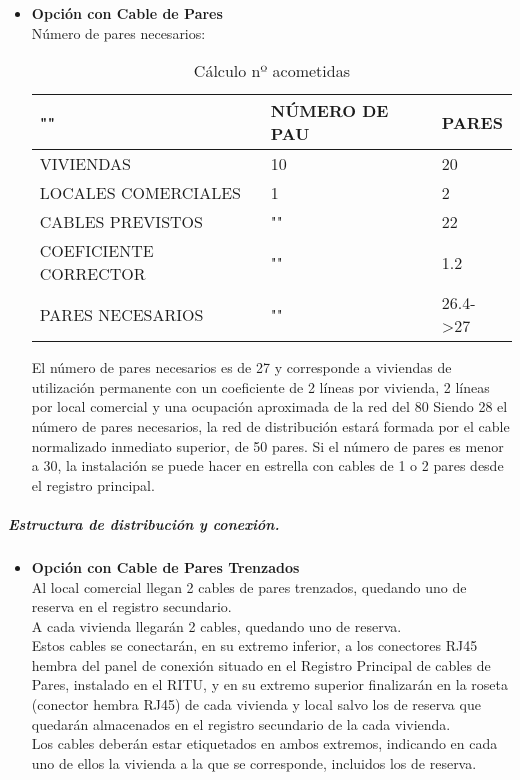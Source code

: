 \begin{itemize}
	\item \textbf{Opción con Cable de Pares}\\
	Número de pares necesarios:\\
	\begin{table}[H]
\centering
\begin{tabular}{p{5cm} p{5cm} p{5cm}}
\hline
""&NÚMERO DE PAU&PARES \\
\hline \hline
VIVIENDAS&10&20\\
\hline
LOCALES COMERCIALES&1&2\\
\hline
CABLES PREVISTOS&""&22\\
\hline
COEFICIENTE CORRECTOR&""&1.2\\
\hline
PARES NECESARIOS&""&26.4->27
\end{tabular}
\caption{Cálculo nº acometidas}
\label{tabla:autores}
\end{table}

El número de pares necesarios es de 27 y corresponde a viviendas de utilización permanente con un coeficiente de 2 líneas por vivienda, 2 líneas por local comercial y una ocupación aproximada de la red del 80%
Siendo 28 el número de pares necesarios, la red de distribución estará formada por el cable normalizado inmediato superior, de 50 pares.
Si el número de pares es menor a 30, la instalación se puede hacer en estrella con cables de 1 o 2 pares desde el registro principal.
\end{itemize}

\subparagraph{Estructura de distribución y conexión.}
\begin{itemize}
	\item \textbf{Opción con Cable de Pares Trenzados}\\
	Al local comercial llegan 2 cables de pares trenzados, quedando uno de reserva en el registro
secundario.\\
A cada vivienda llegarán 2 cables, quedando uno de reserva.\\
Estos cables se conectarán, en su extremo inferior, a los conectores RJ45 hembra del panel de
conexión situado en el Registro Principal de cables de Pares, instalado en el RITU, y en su
extremo superior finalizarán en la roseta (conector hembra RJ45) de cada vivienda y local salvo
los de reserva que quedarán almacenados en el registro secundario de la cada vivienda.\\
Los cables deberán estar etiquetados en ambos extremos, indicando en cada uno de ellos la
vivienda a la que se corresponde, incluidos los de reserva.
\end{itemize}


